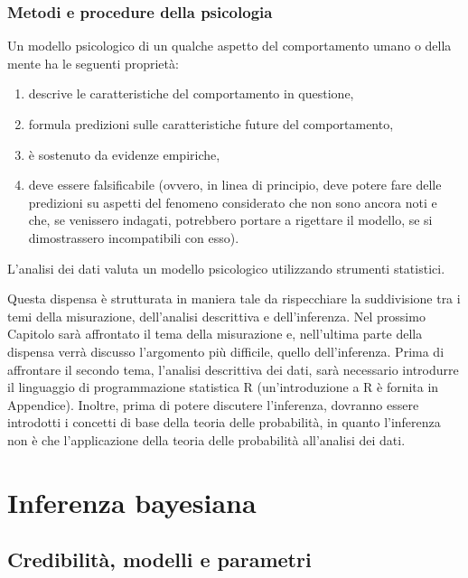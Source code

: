 \documentclass[
]{book}
\providecommand{\tightlist}{%
  \setlength{\itemsep}{0pt}\setlength{\parskip}{0pt}}
\theoremstyle{definition}
\theoremstyle{definition}
\theoremstyle{definition}
\theoremstyle{definition}
\theoremstyle{remark}
\begin{document}
\hypertarget{metodi-e-procedure-della-psicologia}{%
\section{Metodi e procedure della psicologia}\label{metodi-e-procedure-della-psicologia}}

Un modello psicologico di un qualche aspetto del comportamento umano o della mente ha le seguenti proprietà:

\begin{enumerate}
\def\labelenumi{\arabic{enumi}.}
\tightlist
\item
  descrive le caratteristiche del comportamento in questione,
\item
  formula predizioni sulle caratteristiche future del comportamento,
\item
  è sostenuto da evidenze empiriche,
\item
  deve essere falsificabile (ovvero, in linea di principio, deve
  potere fare delle predizioni su aspetti del fenomeno considerato che
  non sono ancora noti e che, se venissero indagati, potrebbero
  portare a rigettare il modello, se si dimostrassero incompatibili con
  esso).
\end{enumerate}

L'analisi dei dati valuta un modello psicologico utilizzando strumenti statistici.

Questa dispensa è strutturata in maniera tale da rispecchiare la suddivisione tra i temi della misurazione, dell'analisi descrittiva e dell'inferenza. Nel prossimo Capitolo sarà affrontato il tema della misurazione e, nell'ultima parte della dispensa verrà discusso l'argomento più difficile, quello dell'inferenza. Prima di affrontare il secondo tema, l'analisi descrittiva dei dati, sarà necessario introdurre il linguaggio di programmazione statistica R (un'introduzione a R è fornita in Appendice). Inoltre, prima di potere discutere l'inferenza, dovranno essere introdotti i concetti di base della teoria delle probabilità, in quanto l'inferenza non è che l'applicazione della teoria delle probabilità all'analisi dei dati.

\mainmatter

\hypertarget{part-inferenza-bayesiana}{%
\part{Inferenza bayesiana}\label{part-inferenza-bayesiana}}

\hypertarget{ch-bayes-workflow}{%
\chapter{Credibilità, modelli e parametri}\label{ch-bayes-workflow}}
\end{document}
